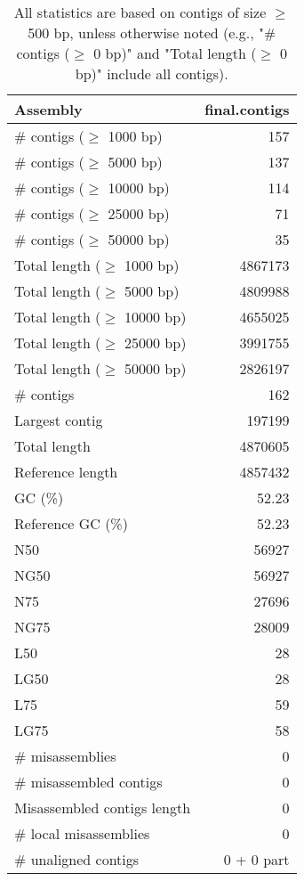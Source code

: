 \documentclass[12pt,a4paper]{article}
\begin{document}
\begin{table}[ht]
\begin{center}
\caption{All statistics are based on contigs of size $\geq$ 500 bp, unless otherwise noted (e.g., "\# contigs ($\geq$ 0 bp)" and "Total length ($\geq$ 0 bp)" include all contigs).}
\begin{tabular}{|l*{1}{|r}|}
\hline
Assembly & final.contigs \\ \hline
\# contigs ($\geq$ 1000 bp) & 157 \\ \hline
\# contigs ($\geq$ 5000 bp) & 137 \\ \hline
\# contigs ($\geq$ 10000 bp) & 114 \\ \hline
\# contigs ($\geq$ 25000 bp) & 71 \\ \hline
\# contigs ($\geq$ 50000 bp) & 35 \\ \hline
Total length ($\geq$ 1000 bp) & 4867173 \\ \hline
Total length ($\geq$ 5000 bp) & 4809988 \\ \hline
Total length ($\geq$ 10000 bp) & 4655025 \\ \hline
Total length ($\geq$ 25000 bp) & 3991755 \\ \hline
Total length ($\geq$ 50000 bp) & 2826197 \\ \hline
\# contigs & 162 \\ \hline
Largest contig & 197199 \\ \hline
Total length & 4870605 \\ \hline
Reference length & 4857432 \\ \hline
GC (\%) & 52.23 \\ \hline
Reference GC (\%) & 52.23 \\ \hline
N50 & 56927 \\ \hline
NG50 & 56927 \\ \hline
N75 & 27696 \\ \hline
NG75 & 28009 \\ \hline
L50 & 28 \\ \hline
LG50 & 28 \\ \hline
L75 & 59 \\ \hline
LG75 & 58 \\ \hline
\# misassemblies & 0 \\ \hline
\# misassembled contigs & 0 \\ \hline
Misassembled contigs length & 0 \\ \hline
\# local misassemblies & 0 \\ \hline
\# unaligned contigs & 0 + 0 part \\ \hline

\end{tabular}
\end{center}
\end{table}
\end{document}
